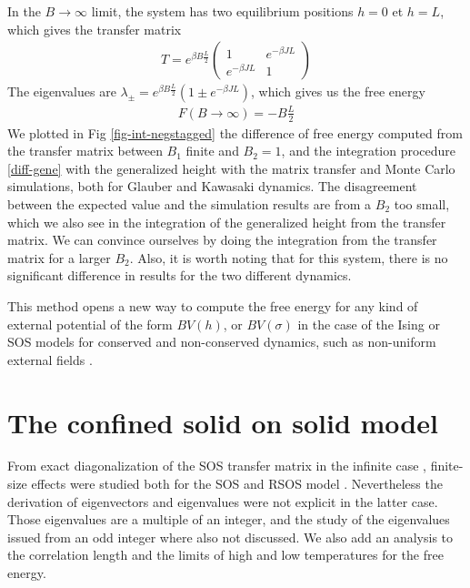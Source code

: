 In the $B \rightarrow \infty$ limit, the system has two equilibrium positions $h=0$ et $h=L$, which gives the transfer matrix
\begin{align}
T= e^{\beta B \frac{L}{2}}
  \begin{pmatrix}
    1 & e^{-\beta  J L} \\
    e^{-\beta  J L} & 1
  \end{pmatrix}
\end{align}
The eigenvalues are $\lambda_\pm = e^{ \beta B \frac{L}{2}}( 1 \pm e^{-\beta J L})$, which gives us the free energy 
\begin{align}
  F(B \rightarrow \infty) = - B \frac{L}{2}
\end{align}
We plotted in Fig \ref{fig-int-negstagged} the difference of free energy computed from the transfer matrix between $B_1$ finite and $B_2=1$, and the integration procedure \eqref{diff-gene} with the generalized height with the matrix transfer and Monte Carlo simulations, both for Glauber and Kawasaki dynamics. The disagreement between the expected value and the simulation results are from a $B_2$ too small, which we also see in the integration of the generalized height from the transfer matrix. We can convince ourselves by doing the integration from the transfer matrix for a larger $B_2$. Also, it is worth noting that for this system, there is no significant difference in results for the two different dynamics.

This method opens a new way to compute the free energy for any kind of external potential of the form $B V(h)$, or $B V(\sigma)$ in the case of the Ising or SOS models for conserved and non-conserved dynamics, such as non-uniform external fields \cite{bissacot_phase_2010}. 



\section{The confined solid on solid model}


From exact diagonalization of the SOS transfer matrix in the infinite case \cite{guyer_sine-gordon_1979}, finite-size effects were studied both for the SOS and RSOS model \cite{svrakic_finite-size_1988,privman_finite-size_1988}. Nevertheless the derivation of eigenvectors and eigenvalues were not explicit in the latter case. Those eigenvalues are a multiple of an integer, and the study of the eigenvalues issued from an odd integer where also not discussed. We also add an analysis to the correlation length and the limits of high and low temperatures for the free energy. 


